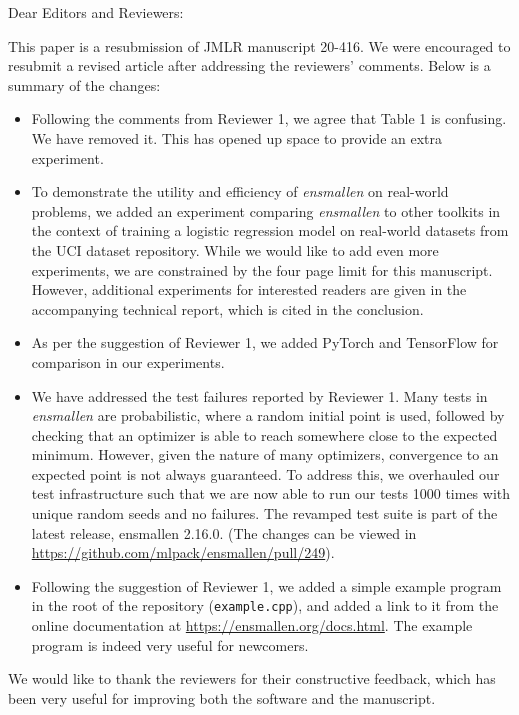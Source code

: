 \documentclass[twoside,11pt]{article}
\begin{document}
\noindent Dear Editors and Reviewers: \\

\medskip

\noindent This paper is a resubmission of JMLR manuscript 20-416.  We were
encouraged to resubmit a revised article after addressing the reviewers' comments.
Below is a summary of the changes:

\begin{itemize}
  \item Following the comments from Reviewer 1, we agree that Table 1 is
confusing. We have removed it.  This has opened up space to provide an extra experiment.

  \item To demonstrate the utility and efficiency of {\it ensmallen} on real-world
problems, we added an experiment comparing {\it ensmallen} to other toolkits in the context of training 
a logistic regression model on real-world datasets from the UCI dataset
repository.  While we would like to add even more experiments,
we are constrained by the four page limit for this manuscript.
However, additional experiments for interested readers are given
in the accompanying technical report, which is cited in the conclusion.

  \item As per the suggestion of Reviewer 1, we added PyTorch and TensorFlow
  for comparison in our experiments.

  \item We have addressed the test failures reported by Reviewer 1.
Many tests in {\it ensmallen} are probabilistic, where a random initial point is used,
followed by checking that an optimizer is able to reach somewhere
close to the expected minimum.  However, given the nature of many optimizers,
convergence to an expected point is not always guaranteed.
To address this, we overhauled our test infrastructure such that we are now able
to run our tests 1000 times with unique random seeds and no failures.
The revamped test suite is part of the latest release, ensmallen 2.16.0.
(The changes can be viewed in \url{https://github.com/mlpack/ensmallen/pull/249}).  

  \item Following the suggestion of Reviewer 1, we added a simple example program
in the root of the repository ({\tt example.cpp}), and added a link to it from the
online documentation at \url{https://ensmallen.org/docs.html}.
The example program is indeed very useful for newcomers.
\end{itemize}

\noindent We would like to thank the reviewers for their constructive feedback,
which has been very useful for improving both the software and the manuscript.
\end{document}
